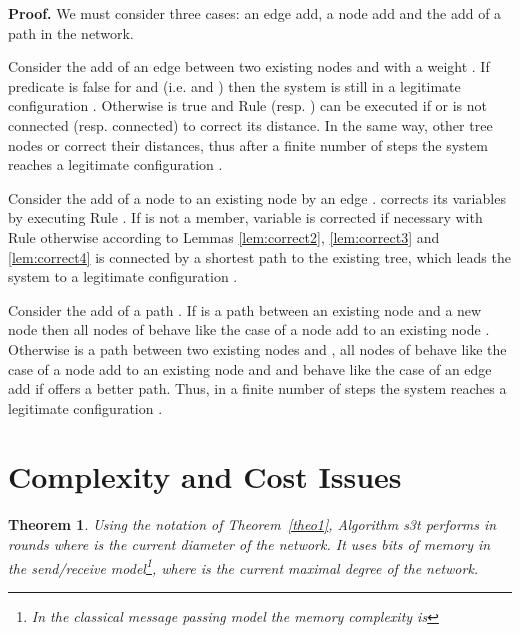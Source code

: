 \documentclass[11pt]{article}
\newtheorem{theorem}{Theorem}
\newenvironment{proof}{\noindent \begin{rm}{\textbf{Proof.} }}{\hspace*{\fill}\par\end{rm} \vspace{.3cm}}
\newcommand{\ARA}{}
\newcommand{\ARB}{}
\newcommand{\CRC}{}
\newcommand{\STT}{{\sc s3t}}
\begin{document}
\begin{proof}
We must consider three cases: an edge add, a node add and the add of a path in the network.

Consider the add of an edge between two existing nodes  and 
with a weight . If predicate  is false for 
and  (i.e.  and ) then the system is still in a legitimate configuration . Otherwise  is true and Rule \ARA\/
(resp. \ARB\/) can be executed if  or  is not connected
(resp. connected) to correct its distance. In the same way, other tree
nodes  or  correct their distances, thus after a finite number
of steps the system reaches a legitimate configuration .

Consider the add of a node  to an existing node  by an edge
.  corrects its variables by executing Rule \ARA\/. If  is
not a member, variable  is corrected if necessary with Rule \CRC\/
otherwise according to Lemmas \ref{lem:correct2}, \ref{lem:correct3}
and \ref{lem:correct4}  is connected by a shortest path to the
existing tree, which leads the system to a legitimate configuration
.

Consider the add of a path . If  is a path between an existing
node  and a new node  then all nodes of  behave like the case
of a node add  to an existing node . Otherwise  is a path
between two existing nodes  and , all nodes of  behave like
the case of a node add to an existing node and  and  behave like
the case of an edge add if  offers a better path. Thus, in a finite
number of steps the system reaches a legitimate configuration .
\end{proof}

\section*{Complexity and Cost Issues}
\begin{theorem}
Using the notation of Theorem~\ref{theo1}, 
Algorithm \STT\/ performs in  rounds where 
 is the current diameter of the
network. It uses  bits of memory in
the send/receive model\footnote{In the classical message passing model
the memory complexity is }, where  is the current maximal degree of the
network.
\end{theorem}
\end{document}
